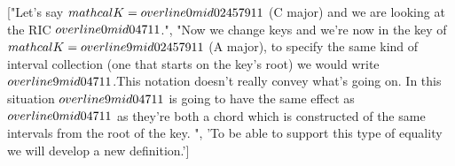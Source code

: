 \documentclass[preview]{standalone}
\begin{document}
\begin{center}
["Let's say $\\mathcal{K} =  \\overline{0} \\mid 0 2 4 5 7 9 11$ (C major) and we are looking at the RIC $ \\overline{0} \\mid 0 4 7 11$.", "Now we change keys and we're now in the key of $ \\mathcal{K} =  \\overline{9} \\mid 0 2 4 5 7 9 11$ (A major), to specify the same kind of interval collection (one that starts on the key's root) we would write $ \\overline{9} \\mid 0 4 7 11$.This notation doesn't really convey what's going on. In this situation $ \\overline{9} \\mid 0 4 7 11$ is going to have the same effect as $ \\overline{0} \\mid 0 4 7 11$ as they're both a chord which is constructed of the same intervals from the root of the key. ", 'To be able to support this type of equality we will develop a new definition.']
\end{center}
\end{document}
